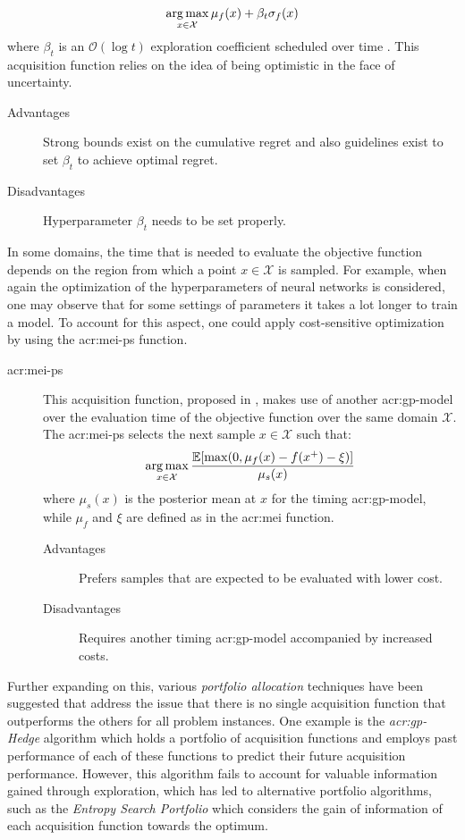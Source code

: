 \begin{description}
	$$\operatorname*{arg\,max}_{x \in \mathcal{X}} \mu_f(x) + \beta_t\sigma_f(x)$$
	where $\beta_t$ is an $\mathcal{O}(\log{t})$ exploration coefficient scheduled over time \cite{perchet2014gaussian}. This acquisition function relies on the idea of being optimistic in the face of uncertainty.
	\begin{description}
		\item[Advantages] Strong bounds exist on the cumulative regret and also guidelines exist to set $\beta_t$ to achieve optimal regret.
		\item[Disadvantages] Hyperparameter $\beta_t$ needs to be set properly.
	\end{description}
\end{description}

In some domains, the time that is needed to evaluate the objective function depends on the region from which a point $x \in \mathcal{X}$ is sampled.
For example, when again the optimization of the hyperparameters of neural networks is considered, one may observe that for some settings of parameters it takes a lot longer to train a model.
To account for this aspect, one could apply cost-sensitive optimization by using the \acrfull{acr:mei-ps} function.
\begin{description}
	\item[\acrfull{acr:mei-ps}] This acquisition function, proposed in \cite{snoek2012practical}, makes use of another \acrshort{acr:gp}-model over the evaluation time of the objective function over the same domain $\mathcal{X}$.
	The \acrshort{acr:mei-ps} selects the next sample $x \in \mathcal{X}$ such that:
	$$\operatorname*{arg\,max}_{x \in \mathcal{X}} \frac{\mathbb{E}[\max(0, \mu_f(x) - f(x^+) - \xi)]}{\mu_s(x)}$$
	where $\mu_s(x)$ is the posterior mean at $x$ for the timing \acrshort{acr:gp}-model, while $\mu_f$ and $\xi$ are defined as in the \acrshort{acr:mei} function.
	\begin{description}
		\item[Advantages] Prefers samples that are expected to be evaluated with lower cost.
		\item[Disadvantages] Requires another timing \acrshort{acr:gp}-model accompanied by increased costs.
	\end{description}
\end{description}

Further expanding on this, various \textit{portfolio allocation} techniques have been suggested that address the issue that there is no single acquisition function that outperforms the others for all problem instances.
One example is the \textit{\acrshort{acr:gp}-Hedge} algorithm \cite{brochu2010portfolio, shahriari2016taking} which holds a portfolio of acquisition functions and employs past performance of each of these functions to predict their future acquisition performance.
However, this algorithm fails to account for valuable information gained through exploration, which has led to alternative portfolio algorithms, such as the \textit{Entropy Search Portfolio} \cite{shahriari2016taking, wang2016optimization} which considers the gain of information of each acquisition function towards the optimum.

